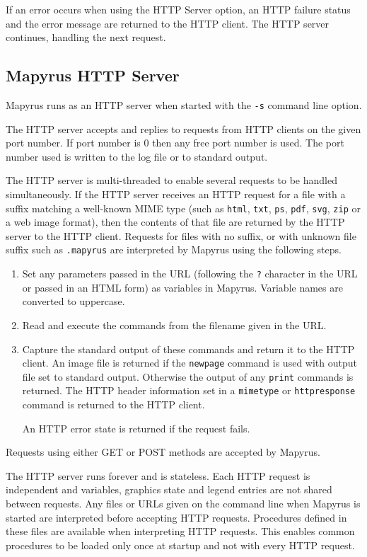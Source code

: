 If an error occurs when using the HTTP Server
option, an HTTP failure status and the error message
are returned to the HTTP client.  The HTTP server continues,
handling the next request.

\subsection{Mapyrus HTTP Server}

Mapyrus runs as an HTTP server when started with the \texttt{-s} command line
option.

The HTTP server accepts and replies to requests from HTTP clients on the given
port number.  If port number is 0 then any free port number is used.  The port
number used is written to the log file or to standard output.

The HTTP server is multi-threaded to enable several requests to be handled
simultaneously.  If the HTTP server receives an HTTP request for a file with a
suffix matching a well-known MIME type (such as \texttt{html}, \texttt{txt},
\texttt{ps}, \texttt{pdf}, \texttt{svg}, \texttt{zip}
or a web image format), then the
contents of that file are returned by the HTTP server to the HTTP client.
Requests for files with no suffix, or with unknown file suffix
such as \texttt{.mapyrus} are interpreted
by Mapyrus using the following steps.

\begin{enumerate}
\item
Set any parameters passed in the URL (following the \texttt{?} character in
the URL or passed in an HTML form) as variables in Mapyrus.
Variable names are converted to uppercase.
\item
Read and execute the commands from the filename given in the URL.
\item
Capture the standard output of these commands and return it to the
HTTP client.
An image file is returned if the
\texttt{newpage} command is used with output file set
to standard output.
Otherwise the output of any \texttt{print} commands is returned.
The HTTP header information set in a
\texttt{mimetype}
or
\texttt{httpresponse}
command is returned to the HTTP client.

An HTTP error state is returned if the request fails.
\end{enumerate}

Requests using either GET or POST methods are accepted by Mapyrus.

The HTTP server runs forever and
is stateless.  Each HTTP request is independent and
variables, graphics state and legend entries are not shared between
requests.
Any files or URLs given on the command line when Mapyrus is started
are interpreted before accepting HTTP requests.
Procedures defined in these files
are available when interpreting HTTP requests.  This enables
common procedures to be loaded only once at startup and not with every
HTTP request.

